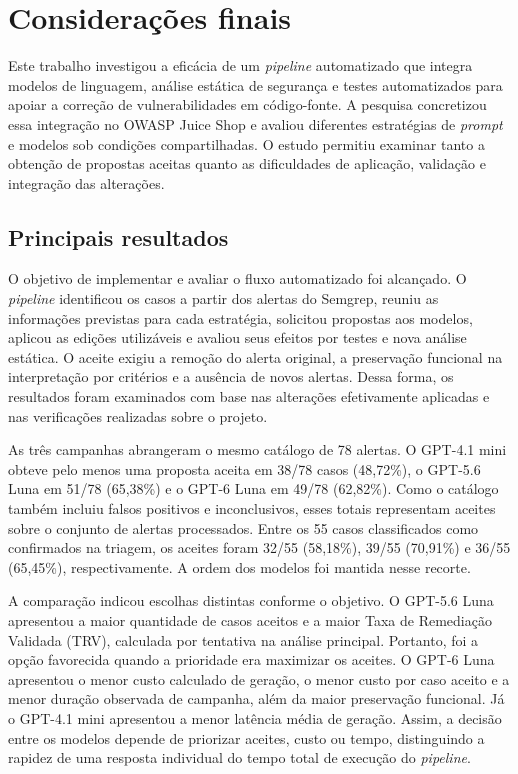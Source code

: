 

\chapter{Considerações finais}

\label{cap:consideracoes-finais}

Este trabalho investigou a eficácia de um \textit{pipeline} automatizado que integra modelos de linguagem, análise estática de segurança e testes automatizados para apoiar a correção de vulnerabilidades em código-fonte. A pesquisa concretizou essa integração no OWASP Juice Shop e avaliou diferentes estratégias de \textit{prompt} e modelos sob condições compartilhadas. O estudo permitiu examinar tanto a obtenção de propostas aceitas quanto as dificuldades de aplicação, validação e integração das alterações.

\section{Principais resultados}

\label{sec:cf-resultados}

O objetivo de implementar e avaliar o fluxo automatizado foi alcançado. O \textit{pipeline} identificou os casos a partir dos alertas do Semgrep, reuniu as informações previstas para cada estratégia, solicitou propostas aos modelos, aplicou as edições utilizáveis e avaliou seus efeitos por testes e nova análise estática. O aceite exigiu a remoção do alerta original, a preservação funcional na interpretação por critérios e a ausência de novos alertas. Dessa forma, os resultados foram examinados com base nas alterações efetivamente aplicadas e nas verificações realizadas sobre o projeto.

As três campanhas abrangeram o mesmo catálogo de 78 alertas. O GPT-4.1 mini obteve pelo menos uma proposta aceita em 38/78 casos (48,72\%), o GPT-5.6 Luna em 51/78 (65,38\%) e o GPT-6 Luna em 49/78 (62,82\%). Como o catálogo também incluiu falsos positivos e inconclusivos, esses totais representam aceites sobre o conjunto de alertas processados. Entre os 55 casos classificados como confirmados na triagem, os aceites foram 32/55 (58,18\%), 39/55 (70,91\%) e 36/55 (65,45\%), respectivamente. A ordem dos modelos foi mantida nesse recorte.

A comparação indicou escolhas distintas conforme o objetivo. O GPT-5.6 Luna apresentou a maior quantidade de casos aceitos e a maior Taxa de Remediação Validada (TRV), calculada por tentativa na análise principal. Portanto, foi a opção favorecida quando a prioridade era maximizar os aceites. O GPT-6 Luna apresentou o menor custo calculado de geração, o menor custo por caso aceito e a menor duração observada de campanha, além da maior preservação funcional. Já o GPT-4.1 mini apresentou a menor latência média de geração. Assim, a decisão entre os modelos depende de priorizar aceites, custo ou tempo, distinguindo a rapidez de uma resposta individual do tempo total de execução do \textit{pipeline}.

